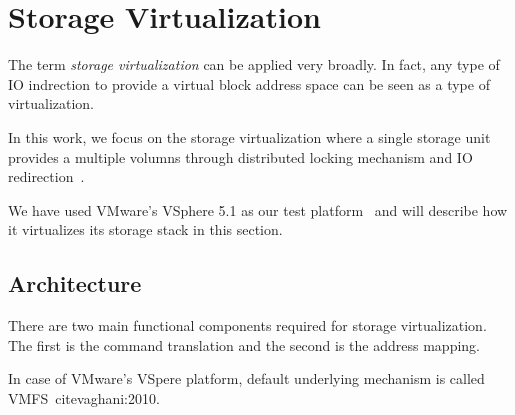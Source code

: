 \section{Storage Virtualization}
\label{VIRT}

The term \emph{storage virtualization} can be applied very broadly. 
In fact, any type of IO indrection to provide a virtual block address space can be seen as a type of virtualization.

In this work, we focus on the storage virtualization where a single storage unit provides a multiple volumns through distributed locking mechanism and IO redirection~\cite{vaghani:2010, gupta:2011, soltis:1996}.

We have used VMware's VSphere 5.1 as our test platform~\cite{vmware:2013} and will describe how it virtualizes its storage stack in this section.

\subsection{Architecture}
There are two main functional components required for storage virtualization.
The first is the command translation and the second is the address mapping. 

In case of VMware's VSpere platform, default underlying mechanism is called VMFS~cite{vaghani:2010}. 
